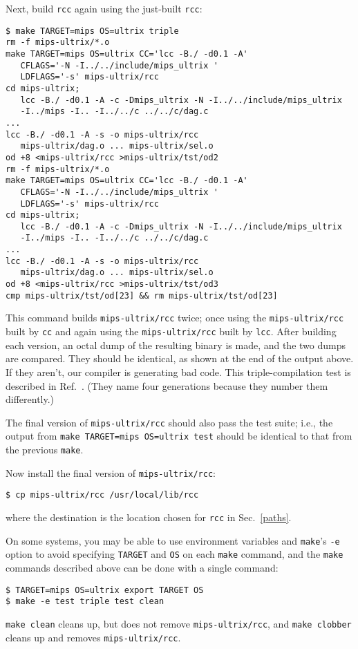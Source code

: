 Next, build \verb|rcc| again using the just-built \verb|rcc|:
\begin{verbatim}
$ make TARGET=mips OS=ultrix triple
rm -f mips-ultrix/*.o
make TARGET=mips OS=ultrix CC='lcc -B./ -d0.1 -A'
   CFLAGS='-N -I../../include/mips_ultrix '
   LDFLAGS='-s' mips-ultrix/rcc
cd mips-ultrix;
   lcc -B./ -d0.1 -A -c -Dmips_ultrix -N -I../../include/mips_ultrix
   -I../mips -I.. -I../../c ../../c/dag.c
...
lcc -B./ -d0.1 -A -s -o mips-ultrix/rcc
   mips-ultrix/dag.o ... mips-ultrix/sel.o
od +8 <mips-ultrix/rcc >mips-ultrix/tst/od2
rm -f mips-ultrix/*.o
make TARGET=mips OS=ultrix CC='lcc -B./ -d0.1 -A'
   CFLAGS='-N -I../../include/mips_ultrix '
   LDFLAGS='-s' mips-ultrix/rcc
cd mips-ultrix;
   lcc -B./ -d0.1 -A -c -Dmips_ultrix -N -I../../include/mips_ultrix
   -I../mips -I.. -I../../c ../../c/dag.c
...
lcc -B./ -d0.1 -A -s -o mips-ultrix/rcc
   mips-ultrix/dag.o ... mips-ultrix/sel.o
od +8 <mips-ultrix/rcc >mips-ultrix/tst/od3
cmp mips-ultrix/tst/od[23] && rm mips-ultrix/tst/od[23]
\end{verbatim}
This command builds \verb|mips-ultrix/rcc| twice; once using the
\verb|mips-ultrix/rcc| built by \verb|cc|
and again using the \verb|mips-ultrix/rcc| built by \verb|lcc|.
After building each version, an octal dump of the resulting binary is made,
and the two dumps are compared. They should be identical, as shown
at the end of the output above.
If they aren't, our compiler is generating bad code.
This triple-compilation test is described in Ref.~\cite{cornelius:etal:84}.
(They name four generations because they number them differently.)

The final version of \verb|mips-ultrix/rcc| should also pass the test suite;
i.e., the output from \verb|make TARGET=mips OS=ultrix test|
should be identical to that from the previous \verb|make|.

Now install the final version of \verb|mips-ultrix/rcc|:
\begin{verbatim}
$ cp mips-ultrix/rcc /usr/local/lib/rcc
\end{verbatim}
where the destination is the location chosen for \verb|rcc| in Sec.~\ref{paths}.

On some systems, you may be able
to use environment variables and \verb|make|'s \verb|-e|
option to avoid specifying \verb|TARGET|
and \verb|OS| on each \verb|make| command, and
the \verb|make| commands described above can be done with a single command:
\begin{verbatim}
$ TARGET=mips OS=ultrix export TARGET OS
$ make -e test triple test clean
\end{verbatim}
\verb|make clean| cleans up, but does not remove \verb|mips-ultrix/rcc|, and
\verb|make clobber| cleans up and removes \verb|mips-ultrix/rcc|.


